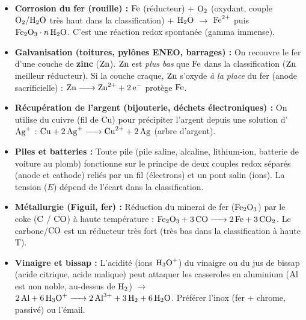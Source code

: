 \documentclass[11pt]{article}
\begin{document}
\begin{savaistu}
\begin{itemize}
  \item \textbf{Corrosion du fer (rouille) :} $\ce{Fe}$ (réducteur) + $\ce{O2}$ (oxydant, couple $\ce{O2}/\ce{H2O}$ très haut dans la classification) + $\ce{H2O}$ $\to$ $\ce{Fe^2+}$ puis $\ce{Fe2O3} \cdot n\,\ce{H2O}$. C'est une réaction redox spontanée (gamma immense).
  \item \textbf{Galvanisation (toitures, pylônes ENEO, barrages) :} On recouvre le fer d'une couche de \textbf{zinc} ($\ce{Zn}$). $\ce{Zn}$ est \emph{plus bas} que $\ce{Fe}$ dans la classification ($\ce{Zn}$ meilleur réducteur). Si la couche craque, $\ce{Zn}$ s'oxyde \emph{à la place} du fer (anode sacrificielle) : $\ce{Zn -> Zn^2+ + 2e-}$ protège $\ce{Fe}$.
  \item \textbf{Récupération de l'argent (bijouterie, déchets électroniques) :} On utilise du cuivre (fil de Cu) pour précipiter l'argent depuis une solution d'$\ce{Ag+}$ : $\ce{Cu + 2Ag+ -> Cu^2+ + 2Ag}$ (arbre d'argent).
  \item \textbf{Piles et batteries :} Toute pile (pile saline, alcaline, lithium-ion, batterie de voiture au plomb) fonctionne sur le principe de deux couples redox séparés (anode et cathode) reliés par un fil (électrons) et un pont salin (ions). La tension ($E$) dépend de l'écart dans la classification.
  \item \textbf{Métallurgie (Figuil, fer) :} Réduction du minerai de fer ($\ce{Fe2O3}$) par le coke ($\ce{C}$ / $\ce{CO}$) à haute température : $\ce{Fe2O3 + 3CO -> 2Fe + 3CO2}$. Le carbone/$\ce{CO}$ est un réducteur très fort (très bas dans la classification à haute T).
  \item \textbf{Vinaigre et bissap :} L'acidité (ions $\ce{H3O+}$) du vinaigre ou du jus de bissap (acide citrique, acide malique) peut attaquer les casseroles en aluminium ($\ce{Al}$ est non noble, au-dessus de $\ce{H2}$) $\to$ $\ce{2Al + 6H3O+ -> 2Al^3+ + 3H2 + 6H2O}$. Préférer l'inox (fer + chrome, passivé) ou l'émail.
\end{itemize}
\end{savaistu}
\end{document}
